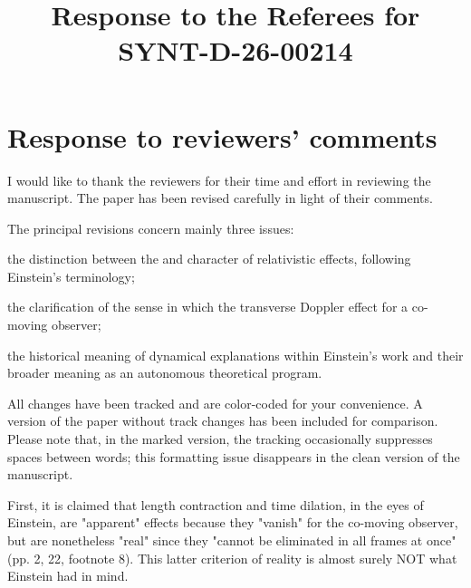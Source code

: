 \documentclass[submitted,11pt]{article}
\title{Response to the Referees for SYNT-D-26-00214}
\begin{document}
\maketitle
\section*{Response to reviewers' comments}

\noindent I would like to thank the reviewers for their time and effort in reviewing the manuscript. The paper has been revised carefully in light of their comments.

\medskip

\noindent The principal revisions concern mainly three issues: \begin{inparaenum}[(a)] \item the distinction between the  and  character of relativistic effects, following Einstein's terminology; \item the clarification of the sense in which the transverse Doppler effect  for a co-moving observer;
\item the historical meaning of dynamical explanations within Einstein's work and their broader meaning as an autonomous theoretical program.
\end{inparaenum}

\medskip 
\noindent All changes have been tracked and are color-coded for your convenience. A version of the paper without track changes has been included for comparison. Please note that, in the marked version, the tracking occasionally suppresses spaces between words; this formatting issue disappears in the clean version of the manuscript. 


\reviewersection

\reviewersection

\begin{point}
First, it is claimed that length contraction and time dilation, in the eyes of Einstein, are "apparent" effects because they "vanish" for the co-moving observer, but are nonetheless "real" since they "cannot be eliminated in all frames at once" (pp. 2, 22, footnote 8). This latter criterion of reality is almost surely NOT what Einstein had in mind. 
\end{point}

\end{document}
